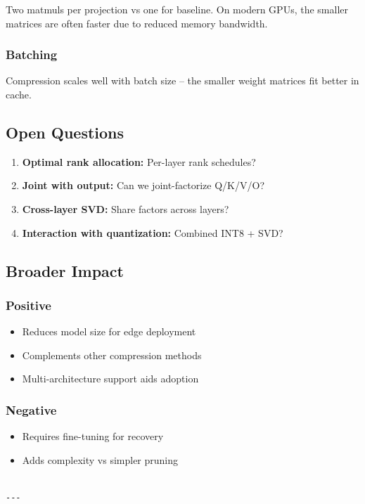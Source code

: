 Two matmuls per projection vs one for baseline. On modern GPUs, the smaller 
matrices are often faster due to reduced memory bandwidth.

\subsubsection{Batching}

Compression scales well with batch size -- the smaller weight matrices fit 
better in cache.

\subsection{Open Questions}

\begin{enumerate}
\item \textbf{Optimal rank allocation:} Per-layer rank schedules?
\item \textbf{Joint with output:} Can we joint-factorize Q/K/V/O?
\item \textbf{Cross-layer SVD:} Share factors across layers?
\item \textbf{Interaction with quantization:} Combined INT8 + SVD?

\end{enumerate}
\subsection{Broader Impact}

\subsubsection{Positive}
\begin{itemize}
\item Reduces model size for edge deployment
\item Complements other compression methods
\item Multi-architecture support aids adoption

\end{itemize}
\subsubsection{Negative}
\begin{itemize}
\item Requires fine-tuning for recovery
\item Adds complexity vs simpler pruning
\end{itemize}
\begin{lstlisting}

---
\end{lstlisting}

